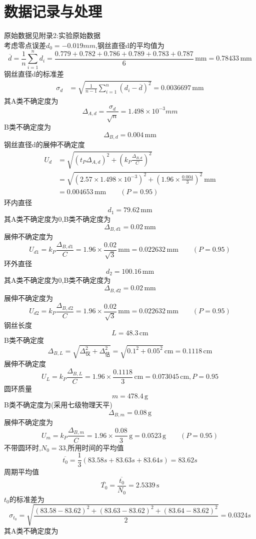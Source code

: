 \documentclass[12pt,a4paper,oneside]{ctexart}
\begin{document}
\section{数据记录与处理}\noindent
原始数据见附录2:实验原始数据\\
考虑零点误差$d_0=-0.019mm$,钢丝直径d的平均值为
$$
\overline{d}=\frac{1}{n}\sum_{i=1}^{n}d_i=\frac{0.779+0.782+0.786+0.789+0.783+0.787}{6}\,\mathrm{mm}=0.78433\,\mathrm{mm}
$$
钢丝直径d的标准差
$$
\begin{aligned}
\sigma_{d}&=\sqrt{\frac{1}{n-1}\sum_{i=1}^n\left(d_i-\overline{d}\right)^2}=0.0036697\,\mathrm{mm}
\end{aligned}
$$
其A类不确定度为
$$\Delta_{A,d}=\dfrac{\sigma_{d}}{\sqrt{n}}=1.498\times10^{-3}mm$$
B类不确定度为
$$
\Delta_{B,d}=0.004\,\mathrm{mm}
$$
钢丝直径d的展伸不确定度
$$
\begin{aligned}
U_{d}&=\sqrt{\left(t_P\Delta_{A,d}\right)^2+\left(k_P\frac{\Delta_{B,d}}{C}\right)^2}\\
&=\sqrt{\left(2.57\times1.498\times10^{-3}\right)^2+\left(1.96\times\frac{0.004}{3}\right)^2}\,\mathrm{mm}\\
&=0.004653\,\mathrm{mm}\qquad(P=0.95)
\end{aligned}
$$
\noindent
环内直径
$$
d_1=79.62\,\mathrm{mm}
$$
其A类不确定度为$0$,B类不确定度为
$$
\Delta_{B,d1}=0.02\,\mathrm{mm}
$$
展伸不确定度为
$$
U_{d1}=k_P\frac{\Delta_{B,d1}}{C}=1.96\times\frac{0.02}{\sqrt{3}}\,\mathrm{mm}=0.022632\,\mathrm{mm}\qquad(P=0.95)
$$
\noindent
环外直径
$$
d_2=100.16\,\mathrm{mm}
$$
其A类不确定度为$0$,B类不确定度为
$$
\Delta_{B,d2}=0.02\,\mathrm{mm}
$$
展伸不确定度为
$$
U_{d2}=k_P\frac{\Delta_{B,d2}}{C}=1.96\times\frac{0.02}{\sqrt{3}}\,\mathrm{mm}=0.022632\,\mathrm{mm}\qquad(P=0.95)
$$
\noindent
钢丝长度
$$
L=48.3\,\mathrm{cm}
$$
B类不确定度
$$
\Delta_{B,L}=\sqrt{\Delta_\text{仪}^2+\Delta_\text{估}^2}=\sqrt{0.1^2+0.05^2}\,\mathrm{cm}=0.1118\,\mathrm{cm}
$$
展伸不确定度
$$
U_{L}=k_P\frac{\Delta_{B,L}}{C}=1.96\times\frac{0.1118}{3}\,\mathrm{cm}=0.073045\,\mathrm{cm},P=0.95
$$
\noindent
圆环质量
$$
m=478.4\,\mathrm{g}
$$
B类不确定度为(采用七级物理天平)
$$
\Delta_{B,m}=0.08\,\mathrm{g}
$$
展伸不确定度为
$$
U_{m}=k_P\frac{\Delta_{B,m}}{C}=1.96\times\frac{0.08}{3}\,\mathrm{g}=0.0523\,\mathrm{g}\qquad(P=0.95)
$$
\noindent
不带圆环时,$N_0=33$,所用时间的平均值
$$\overline{t_0}=\frac{1}{3}(83.58s+83.63s+83.64s)=83.62s$$
周期平均值
$$
\overline{T_0}=\frac{\overline{t_0}}{N_0}=2.5339\,\mathrm{s}
$$
$t_0$的标准差为
$$\sigma_{t_0}=\sqrt{\dfrac{(83.58-83.62)^2+(83.63-83.62)^2+(83.64-83.62)^2}{2}}=0.0324s$$
其A类不确定度为
\end{document}
